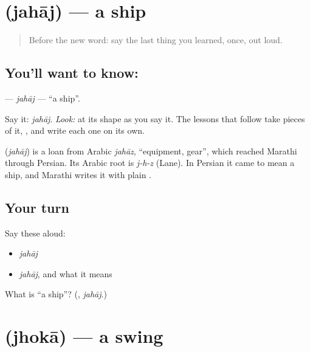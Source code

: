 \section[\texorpdfstring{\mr{जहाज} (jahāj)}{जहाज (jahāj)}]{ (jahāj) — a ship}

\label{lesson:MR-C06-jahaj}



\begin{quote}
Before the new word: say the last thing you learned, once, out loud.
\end{quote}

\subsection*{You'll want to know: }
\textbf{} — \emph{jahāj} — \textquotedblleft{}a ship\textquotedblright{}.

Say it: \emph{jahāj}. \emph{Look:} at its shape as you say it. The lessons that follow take pieces of it, \textbf{}, and write each one on its own.

\begin{cousinweb}
\textbf{} (\emph{jahāj}) is a loan from Arabic \emph{jahāz}, \textquotedblleft{}equipment, gear\textquotedblright{}, which reached Marathi through Persian. Its Arabic root is \emph{j-h-z} (Lane). In Persian it came to mean a ship, and Marathi writes it with plain \textbf{}.
\end{cousinweb}

\subsection*{Your turn}
Say these aloud:

\begin{itemize}
\raggedright
  \item \emph{jahāj}
  \item \emph{jahāj}, and what it means
\end{itemize}

\begin{tcolorbox}[breakable,colback=teal!4,colframe=teal!35!black,title={Before you move on}]
What is \textquotedblleft{}a ship\textquotedblright{}? (\textbf{}, \emph{jahāj}.)
\end{tcolorbox}
\section[\texorpdfstring{\mr{झोका} (jhokā)}{झोका (jhokā)}]{ (jhokā) — a swing}


